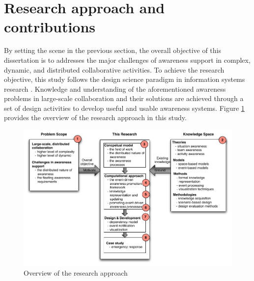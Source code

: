 \section{Research approach and contributions} %
\label{sec:research_approach_and_contributions}
By setting the scene in the previous section, the overall objective of this dissertation is to addresses the major challenges of awareness support in complex, dynamic, and distributed collaborative activities. To achieve the research objective, this study follows the design science paradigm in information systems research \cite{Hevner2004}. Knowledge and understanding of the aforementioned awareness problems in large-scale collaboration and their solutions are achieved through a set of design activities to develop useful and usable awareness systems. Figure \ref{fig:research_overview} provides the overview of the research approach in this study.

\begin{figure}[htbp] %
   \centering
   \includegraphics[width=5.8in]{research_overview.pdf} 
   \caption{Overview of the research approach}
   \label{fig:research_overview}
\end{figure}

